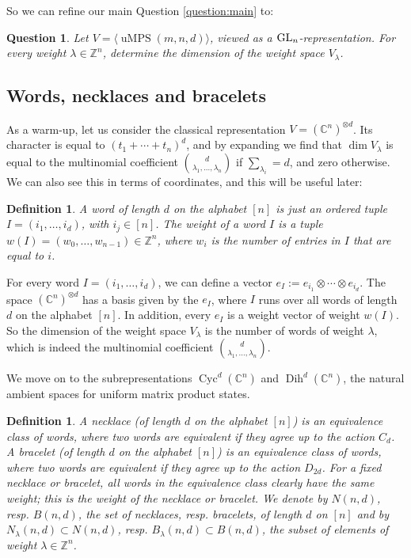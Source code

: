 \documentclass[10pt,a4paper]{amsart}
\numberwithin{equation}{section}
\newtheorem{Question}[Theorem]{Question}
\newtheorem{Definition}[Theorem]{Definition}
\newcommand{\ZZ}{\mathbb{Z}}
\newcommand{\CC}{\mathbb{C}}
\newcommand{\ot}{\otimes}
\DeclareMathOperator{\uMPS}{uMPS}
\DeclareMathOperator{\Cyc}{Cyc}
\DeclareMathOperator{\Dih}{Dih}
\begin{document}
So we can refine our main Question \ref{question:main} to:
 \begin{Question} \label{question:repPrecise}
 Let $V=\langle \uMPS(m,n,d) \rangle$, viewed as a ${\rm GL}_n$-representation.
 For every weight $\lambda \in \ZZ^n$, determine the dimension of the weight space $V_{\lambda}$.
 \end{Question}

\subsection{Words, necklaces and bracelets}
  As a warm-up, let us consider the classical representation $V=(\CC^n)^{\ot d}$. Its character is equal to $(t_1+\cdots+t_n)^d$, and by expanding we find that $\dim{V_\lambda}$ is equal to the multinomial coefficient $\binom{d}{\lambda_1, \dots,  \lambda_n}$ if $\sum_{\lambda_i} = d$, and zero otherwise.
We can also see this in terms of coordinates, and this will be useful later:
\begin{Definition}
    A \emph{word} of length $d$ on the alphabet $[n]$ is just an ordered tuple $I=(i_1,\dots,i_d)$, with $i_j \in [n]$. The \emph{weight} of a word $I$ is a tuple $w(I) = (w_0,\dots,w_{n-1}) \in \ZZ^n$, where $w_i$ is the number of entries in $I$ that are equal to $i$.
\end{Definition}
For every word $I=(i_1,\dots, i_d)$, we can define a vector $e_I := e_{i_1} \otimes \cdots \otimes e_{i_d}$. The space $(\CC^n)^{\ot d}$ has a basis given by the $e_I$, where $I$ runs over all words of length $d$ on the alphabet $[n]$. In addition, every $e_I$ is a weight vector of weight $w(I)$. So the dimension of the weight space $V_\lambda$ is the number of words of weight $\lambda$, which is indeed the multinomial coefficient $\binom{d}{\lambda_1, \dots,  \lambda_n}$.

 We move on to the subrepresentations $\Cyc^d(\CC^n)$ and $\Dih^d(\CC^n)$, the natural ambient spaces for uniform matrix product states.

 \begin{Definition}
     A \emph{necklace} (of length $d$ on the alphabet $[n]$) is an equivalence class of words, where two words are equivalent if they agree up to the action $C_d$. A \emph{bracelet} (of length $d$ on the alphabet $[n]$) is an equivalence class of words, where two words are equivalent if they agree up to the action $D_{2d}$. For a fixed necklace or bracelet, all words in the equivalence class clearly have the same weight; this is the \emph{weight} of the necklace or bracelet. We denote by $N(n,d)$, resp. $B(n,d)$, the set of necklaces, resp. bracelets, of length $d$ on $[n]$ and by $N_{\lambda}(n,d)\subset N(n,d)$, resp. $B_{\lambda}(n,d)\subset B(n,d)$, the subset of elements of weight $\lambda\in \ZZ^n$.
 \end{Definition}
\end{document}
